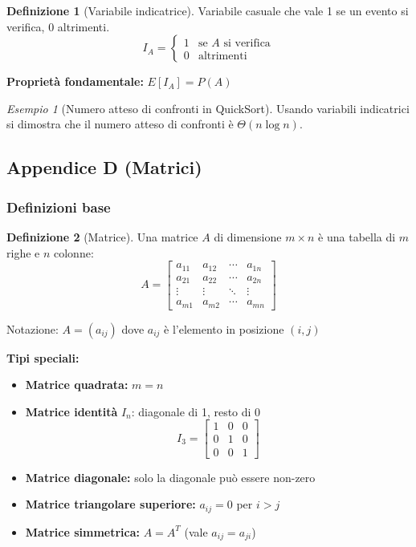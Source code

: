 \documentclass[a4paper, 11pt]{article}
\theoremstyle{definition}
\newtheorem{definizione}{Definizione}[section]
\theoremstyle{remark}
\newtheorem{esempio}{Esempio}[section]
\theoremstyle{remark}
\begin{document}
	\begin{definizione}[Variabile indicatrice]
		Variabile casuale che vale 1 se un evento si verifica, 0 altrimenti.
		\[
		I_A = \begin{cases}
			1 & \text{se } A \text{ si verifica} \\
			0 & \text{altrimenti}
		\end{cases}
		\]
		
		\textbf{Proprietà fondamentale:} $E[I_A] = P(A)$
	\end{definizione}
	
	\begin{esempio}[Numero atteso di confronti in QuickSort]
		Usando variabili indicatrici si dimostra che il numero atteso di confronti è $\Theta(n \log n)$.
	\end{esempio}
	
	\subsection{Appendice D (Matrici)}
	
	\subsubsection{Definizioni base}
	
	\begin{definizione}[Matrice]
		Una matrice $A$ di dimensione $m \times n$ è una tabella di $m$ righe e $n$ colonne:
		\[
		A = \begin{bmatrix}
			a_{11} & a_{12} & \cdots & a_{1n} \\
			a_{21} & a_{22} & \cdots & a_{2n} \\
			\vdots & \vdots & \ddots & \vdots \\
			a_{m1} & a_{m2} & \cdots & a_{mn}
		\end{bmatrix}
		\]
		
		Notazione: $A = (a_{ij})$ dove $a_{ij}$ è l'elemento in posizione $(i,j)$
	\end{definizione}
	
	\textbf{Tipi speciali:}
	\begin{itemize}
		\item \textbf{Matrice quadrata:} $m = n$
		\item \textbf{Matrice identità} $I_n$: diagonale di 1, resto di 0
		\[
		I_3 = \begin{bmatrix}
			1 & 0 & 0 \\
			0 & 1 & 0 \\
			0 & 0 & 1
		\end{bmatrix}
		\]
		\item \textbf{Matrice diagonale:} solo la diagonale può essere non-zero
		\item \textbf{Matrice triangolare superiore:} $a_{ij} = 0$ per $i > j$
		\item \textbf{Matrice simmetrica:} $A = A^T$ (vale $a_{ij} = a_{ji}$)
	\end{itemize}
	
\end{document}
